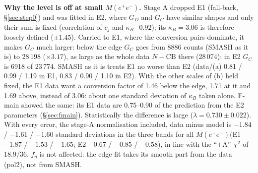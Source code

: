 \documentclass[11pt,a4paper]{article}
\newcommand{\Mee}{\ensuremath{M(e^{+}e^{-})}\xspace}
\newcommand{\kB}{\ensuremath{\kappa_B}\xspace}
\begin{document}
\textbf{Why the level is off at small \Mee.} Stage A dropped E1 (fall-back, \S\ref{sec:step0}) and was fitted in E2, where $G_D$ and $G_C$ have
similar shapes and only their sum is fixed (correlation of $c_j$ and \kB $-0.92$); its $\kB=3.06$ is therefore loosely defined ($\pm1.45$).
Carried to E1, where the conversion pairs dominate, it makes $G_C$ much larger: below the edge $G_C$ goes from 8886 counts (SMASH as it is) to
28\,198 ($\times3.17$), as large as the whole data $N-\mathrm{CB}$ there (28\,074); in E2 $G_C$ is 6918 of 23\,774. SMASH as it is treats E1 no
worse than E2 (data/(a) 0.81 / 0.99 / 1.19 in E1, 0.83 / 0.90 / 1.10 in E2). With the other scales of (b) held fixed, the E1 data want a
conversion factor of 1.46 below the edge, 1.71 at it and 1.69 above, instead of 3.06: about one standard deviation of \kB taken alone. F-main
showed the same: its E1 data are 0.75--0.90 of the prediction from the E2 parameters (\S\ref{sec:fmain}). Statistically the difference is large
($\lambda=0.730\pm0.022$). With every error, the stage-A normalisation included, data minus model is $-1.84$ / $-1.61$ / $-1.60$ standard
deviations in the three bands for all \Mee (E1 $-1.87$ / $-1.53$ / $-1.65$; E2 $-0.67$ / $-0.85$ / $-0.58$), in line with the ``$+$A'' $\chi^2$
of 18.9/36. $f_\eta$ is not affected: the edge fit takes its smooth part from the data (pol2), not from SMASH.
\end{document}
